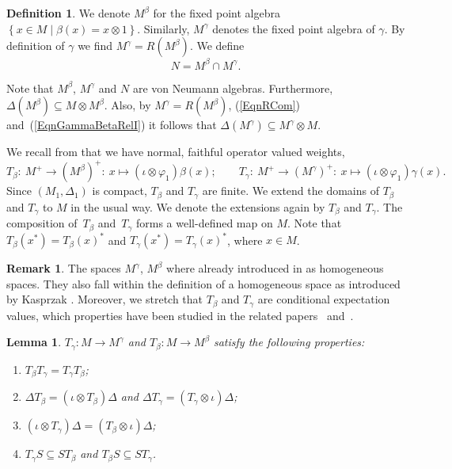 \documentclass[11pt]{article}
\numberwithin{equation}{section}
\newtheorem{lem}[thm]{Lemma}
\theoremstyle{definition}
\newtheorem{dfn}[thm]{Definition}
\newtheorem{rmk}[thm]{Remark}
\begin{document}
\begin{dfn}
We denote $M^\beta$ for the f\/ixed point algebra $\left\{ x \in M \mid \beta(x) = x \otimes 1 \right\}$. Similarly, $M^\gamma$ denotes the f\/ixed point algebra of $\gamma$. By def\/inition of $\gamma$ we f\/ind $M^\gamma = R(M^\beta)$.  We def\/ine
\[
N = M^\beta \cap M^\gamma.
\]
\end{dfn}
Note that $M^\beta$, $M^\gamma$ and $N$ are von Neumann algebras. Furthermore, $\Delta( M^\beta) \subseteq M \otimes M^\beta$. Also, by $M^\gamma = R(M^\beta)$, (\ref{EqnRCom}) and~(\ref{EqnGammaBetaRelI}) it follows that $\Delta(M^\gamma) \subseteq M^\gamma \otimes M$.



We recall from \cite{VaeUni} that we have normal, faithful operator valued weights,
\[
 T_\beta: \  M^+ \rightarrow (M^{\beta})^{+}: \ x \mapsto (\iota \otimes \varphi_1) \beta(x);\qquad
 T_\gamma: \ M^+ \rightarrow (M^{\gamma})^{+}: \ x \mapsto (\iota \otimes \varphi_1) \gamma(x).
\]
Since $(M_1, \Delta_1)$ is compact, $T_\beta$ and $T_\gamma$ are f\/inite. We extend the domains of $T_\beta$ and $T_\gamma$ to $M$ in the usual way. We denote the extensions again by $T_\beta$ and $T_\gamma$. The composition of~$T_\beta$ and~$T_\gamma$ forms a well-def\/ined map on $M$. Note that $T_\beta(x^\ast) = T_\beta(x)^\ast$ and $T_\gamma(x^\ast) = T_\gamma(x)^\ast$, where $x \in M$.

\begin{rmk}
The spaces $M^\gamma$, $M^\beta$ where already introduced in \cite{VaeImp} as homogeneous spaces. They also fall within the def\/inition of a homogeneous space as introduced  by Kasprzak \cite[Remark~3.3]{Kas}. Moreover, we stretch that $T_\beta$ and $T_\gamma$ are conditional expectation values, which properties have been studied in the related papers~\cite{SalmiSkalski} and~\cite{Tomatsu}.
\end{rmk}


\begin{lem}\label{LemTProperties} $T_\gamma: M \rightarrow M^\gamma$ and $T_\beta: M \rightarrow M^\beta$ satisfy the following properties:
\begin{enumerate}\itemsep=0pt
\item\label{LemTI} $T_\beta T_\gamma = T_\gamma T_\beta $;
\item\label{LemTII} $\Delta  T_\beta = (\iota \otimes T_\beta) \Delta$ and  $\Delta T_\gamma = (T_\gamma \otimes \iota)  \Delta$;
\item\label{LemTIII} $(\iota \otimes T_\gamma)  \Delta = (T_\beta \otimes \iota)  \Delta$;
\item\label{LemTIV}  $T_\gamma S \subseteq S T_\beta$ and  $T_\beta S \subseteq S T_\gamma$.
\end{enumerate}
\end{lem}
\end{document}
